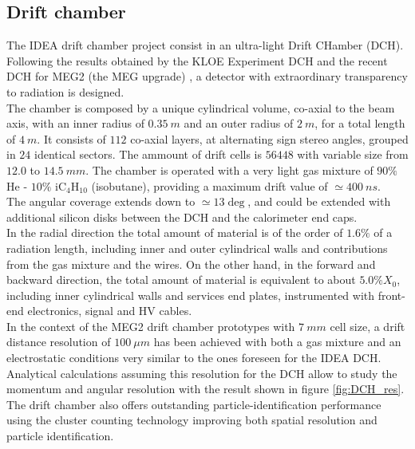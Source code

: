 \subsection{Drift chamber}
The IDEA drift chamber project consist in an ultra-light Drift CHamber (DCH). Following the results obtained by the KLOE Experiment DCH \cite{KLOE} and the recent DCH for MEG2 (the MEG upgrade) \cite{MEG2}, a detector with extraordinary transparency to radiation is designed.\\

The chamber is composed by a unique cylindrical volume, co-axial to the beam axis, with an inner radius of $0.35\ m$ and an outer radius of $2\ m$, for a total length of $4\ m$. It consists of $112$ co-axial layers, at alternating sign stereo angles, grouped in $24$ identical sectors. The ammount of drift cells is $56448$ with variable size from $12.0$ to $14.5\ mm$.
The chamber is operated with a very light gas mixture of $90\%$ He - $10\%$ iC$_4$H$_{10}$ (isobutane), providing a maximum drift value of $\simeq 400\ ns$.\\
The angular coverage extends down to $\simeq 13\deg$, and could be extended with additional silicon disks between the DCH and the calorimeter end caps.\\
In the radial direction the total amount of material is of the order of $1.6\%$ of a radiation length, including inner and outer cylindrical walls and contributions from the gas mixture and the wires. On the other hand, in the forward and backward direction, the total amount of material is equivalent to about $5.0\% X_0$, including inner cylindrical walls and services end plates, instrumented with front-end electronics, signal and HV cables.\\

In the context of the MEG2 drift chamber prototypes \cite{MEG2} with $7\ mm$ cell size, a drift distance resolution of $100\ \mu m$ has been achieved with both a gas mixture and an electrostatic conditions very similar to the ones foreseen for the IDEA DCH.
Analytical calculations assuming this resolution for the DCH allow to study the momentum and angular resolution with the result shown in figure \ref{fig:DCH_res}.
The drift chamber also offers outstanding particle-identification performance using the cluster counting technology improving both spatial resolution and particle identification.

